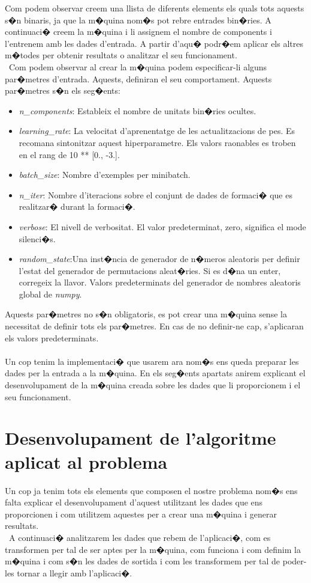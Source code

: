 \documentclass[12pt,a4paper,openright,oneside]{article}
\numberwithin{equation}{section}
\theoremstyle{definition}
\begin{document}
Com podem observar creem una llista de diferents elements els quals tots aquests s�n binaris, ja que la m�quina nom�s pot rebre entrades bin�ries. A continuaci� creem la m�quina i li assignem el nombre de components i l'entrenem amb les dades d'entrada. A partir d'aqu� podr�em aplicar els altres m�todes per obtenir resultats o analitzar el seu funcionament.\\\
Com podem observar al crear la m�quina podem especificar-li alguns par�metres d'entrada. Aquests, definiran el seu comportament. Aquests par�metres s�n els seg�ents:
\begin{itemize}
\item \textit{n\_components}: Estableix el nombre de unitats bin�ries ocultes.
\item \textit{learning\_rate}: La velocitat d'aprenentatge de les actualitzacions de pes. Es recomana sintonitzar aquest hiperparametre. Els valors raonables es troben en el rang de 10 ** [0., -3.].
\item \textit{batch\_size}: Nombre d'exemples per minibatch.
\item \textit{n\_iter}: Nombre d'iteracions sobre el conjunt de dades de formaci� que es realitzar� durant la formaci�.
\item \textit{verbose}: El nivell de verbositat. El valor predeterminat, zero, significa el mode silenci�s.
\item \textit{random\_state}:Una inst�ncia de generador de n�meros aleatoris per definir l'estat del generador de permutacions aleat�ries. Si es d�na un enter, corregeix la llavor. Valors predeterminats del generador de nombres aleatoris global de \textit{numpy}.
\end{itemize}
Aquests par�metres no s�n obligatoris, es pot crear una m�quina sense la necessitat de definir tots els par�metres. En cas de no definir-ne cap, s'aplicaran els valors predeterminats.\\\\
Un cop tenim la implementaci� que usarem ara nom�s ens queda preparar les dades per la entrada a la m�quina. En els seg�ents apartats anirem explicant el desenvolupament de la m�quina creada sobre les dades que li proporcionem i el seu funcionament.
\newpage
\section{Desenvolupament de l'algoritme aplicat al problema}
Un cop ja tenim tots els elements que composen el nostre problema nom�s ens falta explicar el desenvolupament d'aquest utilitzant les dades que ens proporcionen i com utilitzem aquestes per a crear una m�quina i generar resultats. \\\
A continuaci� analitzarem les dades que rebem de l'aplicaci�, com es transformen per tal de ser aptes per la m�quina, com funciona i com definim la m�quina i com s�n les dades de sortida i com les transformem per tal de poder-les tornar a llegir amb l'aplicaci�.
\end{document}
